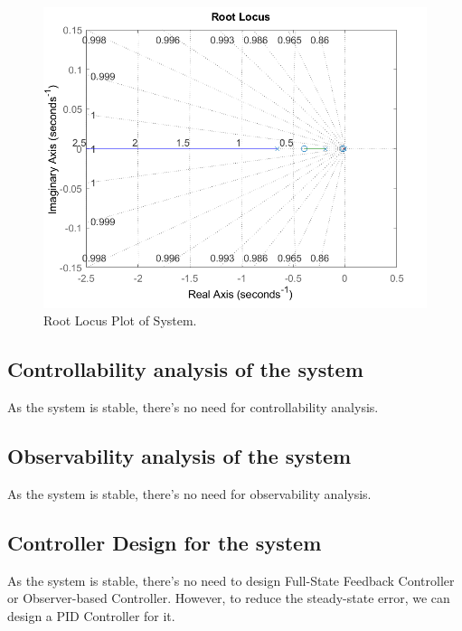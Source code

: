 \documentclass{article}
\begin{document}
\begin{figure}[h!]
	\centering
	\includegraphics[scale=0.75]{images/rootLocus.png}
	\caption{Root Locus Plot of System.}
	\label{fig:rootLocus}
\end{figure}


\subsection{Controllability analysis of the system}
As the system is stable, there's no need for controllability analysis.

\subsection{Observability analysis of the system}
As the system is stable, there's no need for observability analysis.

\subsection{Controller Design for the system}
As the system is stable, there's no need to design Full-State Feedback Controller or Observer-based Controller.
However, to reduce the steady-state error, we can design a PID Controller for it.

\end{document}
